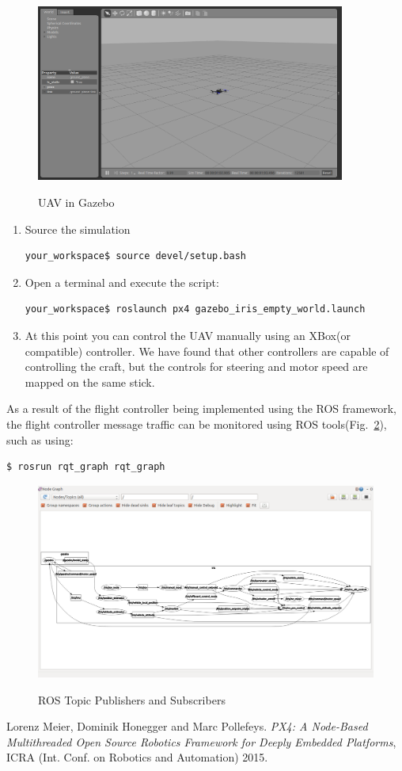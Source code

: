 \documentclass[10pt,a4paper,notitlepage]{report}
\begin{document}
\begin{figure}[h]
\includegraphics[width=4in]{rossitl.png}
\label{fig:sim}
\caption{UAV in Gazebo}
\end{figure}
\begin{enumerate}
\item Source the simulation
\begin{lstlisting}[language=bash]
your_workspace$ source devel/setup.bash 
\end{lstlisting}
\item Open a terminal and execute the script:
\begin{lstlisting}[language=bash]
your_workspace$ roslaunch px4 gazebo_iris_empty_world.launch 
\end{lstlisting}
\item At this point you can control the UAV manually using an XBox(or compatible) controller. We have found that other controllers are capable of controlling the craft, but the controls for steering and motor speed are mapped on the same stick.
\end{enumerate}


\noindent As a result of the flight controller being implemented using the ROS framework, the flight controller message traffic can be monitored using ROS tools(Fig.~\ref{fig:rostopics}), such as using:
\begin{lstlisting}[language=bash]
$ rosrun rqt_graph rqt_graph
\end{lstlisting}

\begin{figure}[h]
\includegraphics[scale=.35]{rqt_graph.png}
\label{fig:rostopics}
\caption{ROS Topic Publishers and Subscribers}
\end{figure}

\begin{thebibliography}{9}
Lorenz Meier, Dominik Honegger and Marc Pollefeys. \textit{PX4: A Node-Based Multithreaded Open Source Robotics Framework for Deeply Embedded Platforms}, ICRA (Int. Conf. on Robotics and Automation) 2015.
\end{thebibliography}
\end{document}
